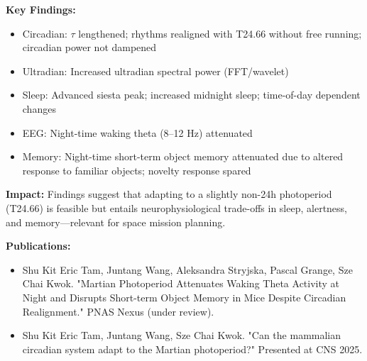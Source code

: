 \textbf{Key Findings:}
\begin{itemize}[leftmargin=1.2em, itemsep=0.1em]
  \item Circadian: \(\tau\) lengthened; rhythms realigned with T24.66 without free running; circadian power not dampened
  \item Ultradian: Increased ultradian spectral power (FFT/wavelet)
  \item Sleep: Advanced siesta peak; increased midnight sleep; time-of-day dependent changes
  \item EEG: Night-time waking theta (8--12 Hz) attenuated
  \item Memory: Night-time short-term object memory attenuated due to altered response to familiar objects; novelty response spared
\end{itemize}

\textbf{Impact:} Findings suggest that adapting to a slightly non-24h photoperiod (T24.66) is feasible but entails neurophysiological trade-offs in sleep, alertness, and memory—relevant for space mission planning.

\vspace{1em}

\textbf{Publications:}
\begin{itemize}[leftmargin=1.2em, itemsep=0.1em]
  \item Shu Kit Eric Tam, Juntang Wang, Aleksandra Stryjska, Pascal Grange, Sze Chai Kwok. "Martian Photoperiod Attenuates Waking Theta Activity at Night and Disrupts Short-term Object Memory in Mice Despite Circadian Realignment." PNAS Nexus (under review).
  \item Shu Kit Eric Tam, Juntang Wang, Sze Chai Kwok. "Can the mammalian circadian system adapt to the Martian photoperiod?" Presented at CNS 2025.
\end{itemize}